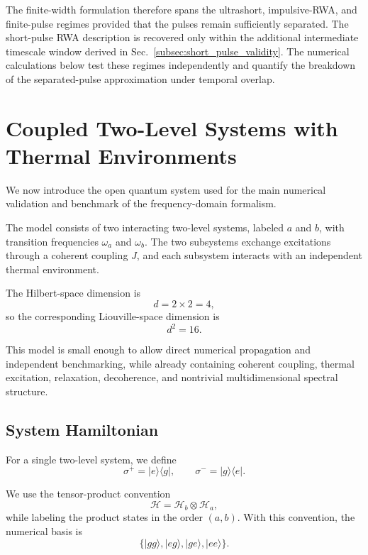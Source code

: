\documentclass[11pt]{article}
\begin{document}
The finite-width formulation therefore spans the ultrashort,
impulsive-RWA, and finite-pulse regimes provided that the pulses remain
sufficiently separated. The short-pulse RWA description is recovered
only within the additional intermediate timescale window derived in
Sec.~\ref{subsec:short_pulse_validity}. The numerical calculations
below test these regimes independently and quantify the breakdown of
the separated-pulse approximation under temporal overlap.


\section{Coupled Two-Level Systems with Thermal Environments}
\label{sec:dimer_model}

We now introduce the open quantum system used for the main numerical
validation and benchmark of the frequency-domain formalism.

The model consists of two interacting two-level systems, labeled
$a$ and $b$, with transition frequencies $\omega_a$ and $\omega_b$.
The two subsystems exchange excitations through a coherent coupling
$J$, and each subsystem interacts with an independent thermal
environment.

The Hilbert-space dimension is
%
\begin{equation}
d=2\times2=4,
\end{equation}
%
so the corresponding Liouville-space dimension is
%
\begin{equation}
d^2=16.
\end{equation}

This model is small enough to allow direct numerical propagation and
independent benchmarking, while already containing coherent coupling,
thermal excitation, relaxation, decoherence, and nontrivial
multidimensional spectral structure.


\subsection{System Hamiltonian}

For a single two-level system, we define
%
\begin{equation}
\sigma^+
=
|e\rangle\langle g|,
\qquad
\sigma^-
=
|g\rangle\langle e|.
\end{equation}

We use the tensor-product convention
%
\begin{equation}
\mathcal{H}
=
\mathcal{H}_b\otimes\mathcal{H}_a,
\end{equation}
%
while labeling the product states in the order $(a,b)$. With this
convention, the numerical basis is
%
\begin{equation}
\{
|gg\rangle,
|eg\rangle,
|ge\rangle,
|ee\rangle
\}.
\end{equation}
\end{document}
